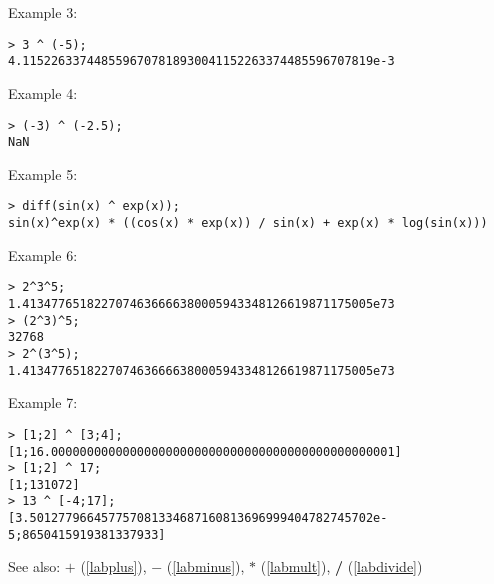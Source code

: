 \noindent Example 3: 
\begin{center}\begin{minipage}{15cm}\begin{Verbatim}[frame=single,commandchars=\\\|\~]
> 3 ^ (-5);
4.1152263374485596707818930041152263374485596707819e-3
\end{Verbatim}
\end{minipage}\end{center}
\noindent Example 4: 
\begin{center}\begin{minipage}{15cm}\begin{Verbatim}[frame=single,commandchars=\\\|\~]
> (-3) ^ (-2.5);
NaN
\end{Verbatim}
\end{minipage}\end{center}
\noindent Example 5: 
\begin{center}\begin{minipage}{15cm}\begin{Verbatim}[frame=single,commandchars=\\\|\~]
> diff(sin(x) ^ exp(x));
sin(x)^exp(x) * ((cos(x) * exp(x)) / sin(x) + exp(x) * log(sin(x)))
\end{Verbatim}
\end{minipage}\end{center}
\noindent Example 6: 
\begin{center}\begin{minipage}{15cm}\begin{Verbatim}[frame=single,commandchars=\\\|\~]
> 2^3^5;
1.4134776518227074636666380005943348126619871175005e73
> (2^3)^5;
32768
> 2^(3^5);
1.4134776518227074636666380005943348126619871175005e73
\end{Verbatim}
\end{minipage}\end{center}
\noindent Example 7: 
\begin{center}\begin{minipage}{15cm}\begin{Verbatim}[frame=single,commandchars=\\\|\~]
> [1;2] ^ [3;4];
[1;16.000000000000000000000000000000000000000000000001]
> [1;2] ^ 17;
[1;131072]
> 13 ^ [-4;17];
[3.501277966457757081334687160813696999404782745702e-5;8650415919381337933]
\end{Verbatim}
\end{minipage}\end{center}
See also: \textbf{$+$} (\ref{labplus}), \textbf{$-$} (\ref{labminus}), \textbf{$*$} (\ref{labmult}), \textbf{/} (\ref{labdivide})
